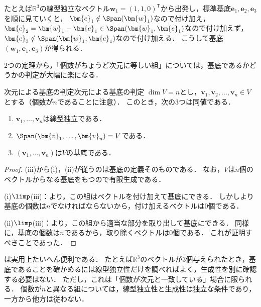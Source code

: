 たとえば$\mathbb{R}^3$の線型独立なベクトル$\bm{w}_1=(1,1,0)^\mathsf{T}$から出発し，標準基底$\bm{e}_1,\bm{e}_2,\bm{e}_3$を順に見ていくと，
$\bm{e}_1\notin\Span(\bm{w}_1)$なので付け加え，
$\bm{e}_2=\bm{w}_1-\bm{e}_1\in\Span(\bm{w}_1,\bm{e}_1)$なので付け加えず，
$\bm{e}_3\notin\Span(\bm{w}_1,\bm{e}_1)$なので付け加える．
こうして基底$(\bm{w}_1,\bm{e}_1,\bm{e}_3)$が得られる．

$2$つの定理から，「個数がちょうど次元に等しい組」については，基底であるかどうかの判定が大幅に楽になる．

\begin{cor}{次元による基底の判定}{次元による基底の判定}
  $\dim V = n$とし，$\bm{v}_1, \bm{v}_2, \dots, \bm{v}_n \in V$とする（個数が$n$であることに注意）．
  このとき，次の$3$つは同値である．
  \begin{enumerate}[label=(\roman*),leftmargin=3.2em]
    \item $\bm{v}_1, \dots, \bm{v}_n$は線型独立である．
    \item $\Span(\bm{v}_1, \dots, \bm{v}_n) = V$である．
    \item $(\bm{v}_1, \dots, \bm{v}_n)$は$V$の基底である．
  \end{enumerate}
\end{cor}

\begin{tleftbar}
\begin{proof}
  (iii)から(i)，(ii)が従うのは基底の定義そのものである．
  なお，$V$は$n$個のベクトルからなる基底をもつので有限生成である．

  (i)$\limp$(iii)：より，この組はベクトルを付け加えて基底にできる．
  しかしより基底の個数は$n$でなければならないから，付け加えるベクトルは$0$個である．

  (ii)$\limp$(iii)：より，この組から適当な部分を取り出して基底にできる．
  同様に，基底の個数は$n$であるから，取り除くベクトルは$0$個である．
  これが証明すべきことであった．
\end{proof}
\end{tleftbar}

\begin{remark}[次元による基底の判定の注意]
  は実用上たいへん便利である．
  たとえば$\mathbb{R}^3$のベクトルが$3$個与えられたとき，基底であることを確かめるには線型独立性だけを調べればよく，生成性を別に確認する必要はない．
  ただし，これは「個数が次元と一致している」場合に限られる．
  個数が$n$と異なる組については，線型独立性と生成性は独立な条件であり，一方から他方は従わない．
\end{remark}

